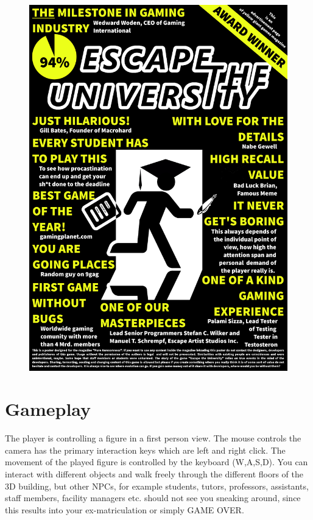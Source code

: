 \documentclass[12pt]{article}
\begin{document}
\begin{minipage}{0.5\textwidth}
	\begin{figure}[H]
	\includegraphics[width=1\linewidth]{Images/poster}
 
\end{figure}

\end{minipage}




\section*{Gameplay} 

The player is controlling a figure in a first person view. The mouse controls the camera has the primary interaction keys which are left and right click. The movement of the played figure is controlled by the keyboard (W,A,S,D). You can interact with different objects and walk freely through the different floors of the 3D building, but other NPCs, for example students, tutors, professors, assistants, staff members, facility managers etc. should not see you sneaking around, since this results into your ex-matriculation or simply GAME OVER.
\end{document}
